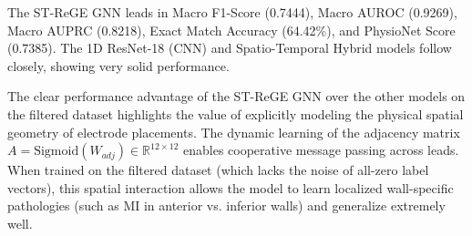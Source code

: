 \documentclass[12pt,a4paper]{report}
\begin{document}
\begin{table}[H]
\caption{Quantitative Benchmark Results on PTB-XL Test Set}
\label{tab:bench_results}
\centering
{}
\end{table}

The ST-ReGE GNN leads in Macro F1-Score (0.7444), Macro AUROC (0.9269), Macro AUPRC (0.8218), Exact Match Accuracy (64.42\%), and PhysioNet Score (0.7385). The 1D ResNet-18 (CNN) and Spatio-Temporal Hybrid models follow closely, showing very solid performance.

The clear performance advantage of the ST-ReGE GNN over the other models on the filtered dataset highlights the value of explicitly modeling the physical spatial geometry of electrode placements. The dynamic learning of the adjacency matrix $A = \text{Sigmoid}(W_{adj}) \in \mathbb{R}^{12 \times 12}$ enables cooperative message passing across leads. When trained on the filtered dataset (which lacks the noise of all-zero label vectors), this spatial interaction allows the model to learn localized wall-specific pathologies (such as MI in anterior vs. inferior walls) and generalize extremely well.
\end{document}
